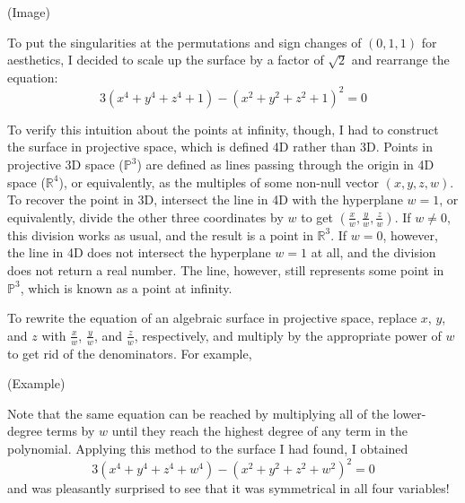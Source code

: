 \documentclass{article}
\begin{document}
(Image)

To put the singularities at the permutations and sign changes of $(0, 1, 1)$ for aesthetics,
I decided to scale up the surface by a factor of $\sqrt{2}$
and rearrange the equation:
$$3(x^4+y^4+z^4+1)-(x^2+y^2+z^2+1)^2=0$$

To verify this intuition about the points at infinity, though,
I had to construct the surface in projective space,
which is defined 4D rather than 3D.
Points in projective 3D space ($\mathbb{P}^3$)
are defined as lines passing through the origin in 4D space ($\mathbb{R}^4$),
or equivalently, as the multiples of some non-null vector $(x, y, z, w)$.
To recover the point in 3D, intersect the line in 4D with the hyperplane $w=1$,
or equivalently, divide the other three coordinates by $w$
to get $\left(\frac{x}{w}, \frac{y}{w}, \frac{z}{w}\right)$.
If $w\neq0$, this division works as usual, and the result is a point in $\mathbb{R}^3$.
If $w=0$, however, the line in 4D does not intersect the hyperplane $w=1$ at all,
and the division does not return a real number.
The line, however, still represents some point in $\mathbb{P}^3$,
which is known as a point at infinity.

To rewrite the equation of an algebraic surface in projective space,
replace $x$, $y$, and $z$ with $\frac{x}{w}$, $\frac{y}{w}$, and $\frac{z}{w}$, respectively,
and multiply by the appropriate power of $w$ to get rid of the denominators.
For example,

(Example)

Note that the same equation can be reached by multiplying all of the lower-degree terms by $w$
until they reach the highest degree of any term in the polynomial.
Applying this method to the surface I had found, I obtained
$$3(x^4+y^4+z^4+w^4)-(x^2+y^2+z^2+w^2)^2=0$$
and was pleasantly surprised to see that it was symmetrical in all four variables!
\end{document}

